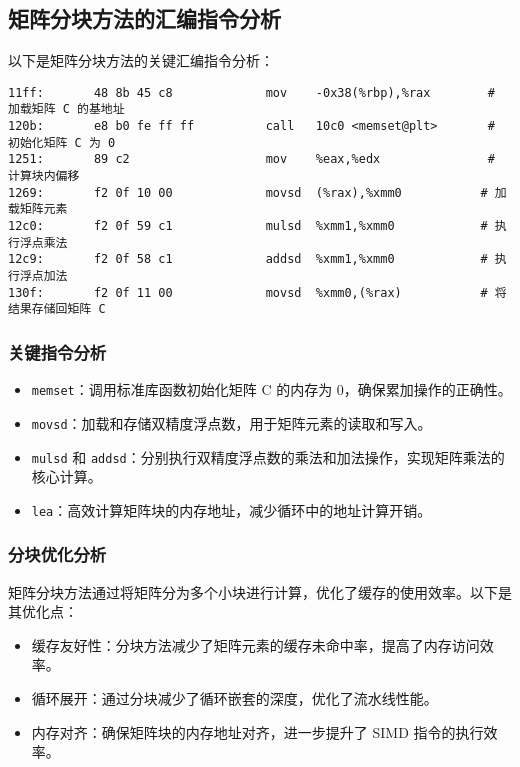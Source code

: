 \documentclass[a4paper,12pt]{ctexart}
\begin{document}
\subsection{矩阵分块方法的汇编指令分析}
以下是矩阵分块方法的关键汇编指令分析：

\begin{lstlisting}[caption={矩阵分块方法的关键汇编指令}]
11ff:       48 8b 45 c8             mov    -0x38(%rbp),%rax        # 加载矩阵 C 的基地址
120b:       e8 b0 fe ff ff          call   10c0 <memset@plt>       # 初始化矩阵 C 为 0
1251:       89 c2                   mov    %eax,%edx               # 计算块内偏移
1269:       f2 0f 10 00             movsd  (%rax),%xmm0           # 加载矩阵元素
12c0:       f2 0f 59 c1             mulsd  %xmm1,%xmm0            # 执行浮点乘法
12c9:       f2 0f 58 c1             addsd  %xmm1,%xmm0            # 执行浮点加法
130f:       f2 0f 11 00             movsd  %xmm0,(%rax)           # 将结果存储回矩阵 C
\end{lstlisting}

\subsubsection{关键指令分析}
\begin{itemize}
    \item \texttt{memset}：调用标准库函数初始化矩阵 C 的内存为 0，确保累加操作的正确性。
    \item \texttt{movsd}：加载和存储双精度浮点数，用于矩阵元素的读取和写入。
    \item \texttt{mulsd} 和 \texttt{addsd}：分别执行双精度浮点数的乘法和加法操作，实现矩阵乘法的核心计算。
    \item \texttt{lea}：高效计算矩阵块的内存地址，减少循环中的地址计算开销。
\end{itemize}

\subsubsection{分块优化分析}
矩阵分块方法通过将矩阵分为多个小块进行计算，优化了缓存的使用效率。以下是其优化点：
\begin{itemize}
    \item 缓存友好性：分块方法减少了矩阵元素的缓存未命中率，提高了内存访问效率。
    \item 循环展开：通过分块减少了循环嵌套的深度，优化了流水线性能。
    \item 内存对齐：确保矩阵块的内存地址对齐，进一步提升了 SIMD 指令的执行效率。
\end{itemize}
\end{document}
